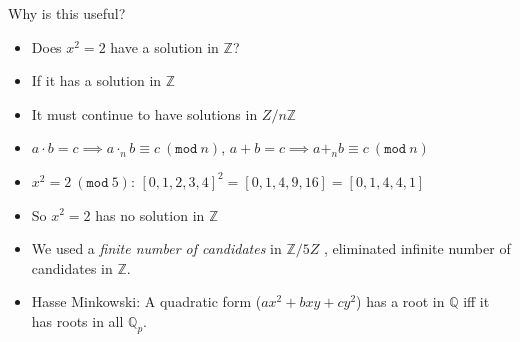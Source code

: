 \documentclass[8pt]{beamer}
\renewcommand{\mod}[1]{\left( \texttt{mod}~#1 \right)}
\newcommand{\Z}{\mathbb Z}
\newcommand{\Q}{\mathbb Q}
\begin{document}
\begin{frame}[fragile]{Why is this useful?}
\begin{itemize}
\item Does $x^2 = 2$ have a solution in $\mathbb Z$?
\item If it has a solution in $\mathbb Z$ \pause
\item It must continue to have solutions in $Z/n\Z$\pause
\item $a \cdot b = c \implies a \cdot_n b \equiv c ~\mod{n}$, $a + b = c \implies a +_n b \equiv c~\mod n$\pause
\item $x^2 = 2~\mod{5}$: $[0, 1, 2, 3, 4]^2 = [0, 1, 4, 9, 16] = [0, 1, 4, 4, 1]$
\item So $x^2 = 2$ has no solution in $\mathbb Z$
\item We used a \emph{finite number of candidates} in $\Z/5Z$ \pause, eliminated infinite number of candidates in $\Z$.
\item Hasse Minkowski: A quadratic form ($ax^2 + bxy + cy^2$) has a root in $\Q$ iff it has roots in all $\Q_p$.
\end{itemize}
\end{frame}
\end{document}

